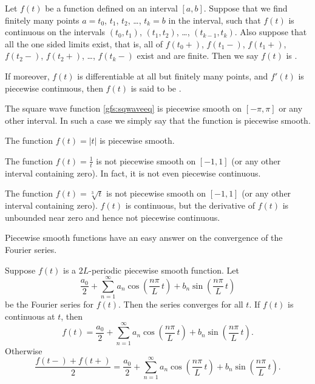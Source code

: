 \documentclass[12pt]{book}
\begin{document}
Let $f(t)$ be a function defined on an interval $[a,b]$.  Suppose
that we find finitely many points
$a=t_0$, $t_1$, $t_2$, \ldots, $t_k=b$ in
the interval, such that $f(t)$ is continuous
on the intervals
$(t_0,t_1)$, 
$(t_1,t_2)$, \ldots, 
$(t_{k-1},t_k)$.
Also suppose that all the one sided limits exist, that is,
all of
$f(t_0+)$,
$f(t_1-)$,
$f(t_1+)$,
$f(t_2-)$,
$f(t_2+)$,
\ldots,
$f(t_k-)$
exist and are finite.
Then
we say $f(t)$ is \emph{}.

If moreover, $f(t)$ is differentiable at all but finitely many points,
and $f'(t)$ is piecewise continuous, then 
$f(t)$ is said to be \emph{}.

\begin{example}
The square wave function \eqref{gfs:sqwaveeq}
is piecewise smooth on $[-\pi,\pi]$ or any other interval.  In such a
case we simply say that the function is piecewise smooth.
\end{example}

\begin{example}
The function $f(t) = \lvert t \lvert$
is piecewise smooth.
\end{example}

\begin{example}
The function $f(t) = \frac{1}{t}$ is not piecewise smooth on
$[-1,1]$ (or any other interval containing zero).  In fact, it is not
even piecewise continuous.
\end{example}

\begin{example}
The function $f(t) = \sqrt[3]{t}$ is not piecewise smooth on
$[-1,1]$ (or any other interval containing zero).  $f(t)$ is continuous, but
the derivative of $f(t)$ is unbounded near zero and hence not piecewise
continuous.
\end{example}

Piecewise smooth functions have an easy answer on the convergence
of the Fourier series.

\begin{theorem}
Suppose $f(t)$ is a $2L$-periodic piecewise smooth function.
Let
\begin{equation*}
\frac{a_0}{2} + \sum_{n=1}^\infty a_n \cos \left( \frac{n \pi}{L} \, t
\right)
+ b_n \sin \left( \frac{n \pi}{L} \, t \right)
\end{equation*}
be the Fourier series for $f(t)$.  Then the series converges
for all $t$.  If $f(t)$ is continuous
at $t$, then
\begin{equation*}
f(t) = \frac{a_0}{2} + \sum_{n=1}^\infty
a_n \cos \left( \frac{n \pi}{L} \, t \right)
+ b_n \sin \left( \frac{n \pi}{L} \, t \right) .
\end{equation*}
Otherwise
\begin{equation*}
\frac{f(t-)+f(t+)}{2} =
\frac{a_0}{2} + \sum_{n=1}^\infty a_n \cos \left( \frac{n \pi}{L} \, t
\right)
+ b_n \sin \left( \frac{n \pi}{L} \, t \right) .
\end{equation*}
\end{theorem}
\end{document}
